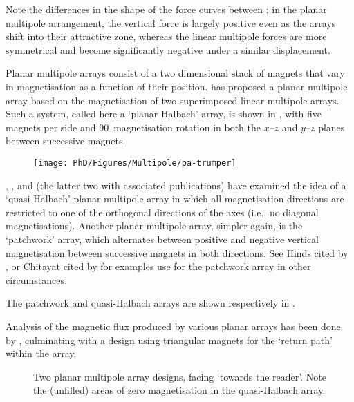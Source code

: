 \documentclass[11pt,a4paper]{memoir}
\begin{document}
Note the differences in the shape of the force curves between ; in the planar multipole arrangement, the vertical force is largely positive even as the arrays shift into their attractive zone, whereas the linear multipole forces are more symmetrical and become significantly negative under a similar displacement.

Planar multipole arrays consist of a two dimensional stack of magnets that vary in magnetisation as a function of their position.
\textcite[Appendix~A]{kim1997-thesis} has proposed a planar multipole array based on the magnetisation of two superimposed linear multipole arrays.
Such a system, called here a `planar Halbach' array, is shown in , with five magnets per side and 90\textdegree\ magnetisation rotation in both the $x$--$z$ and $y$--$z$ planes between successive magnets.

\begin{figure}
\centering
\texttt{[image: PhD/Figures/Multipole/pa-trumper]}
\end{figure}


\textcite{moser2002-maglev}, \textcite{rovers2009-ietm}, and \textcite{janssen2009-jsdd} (the latter two with associated publications) have examined the idea of a `quasi-Halbach' planar multipole array in which all magnetisation directions are restricted to one of the orthogonal directions of the axes (i.e., no diagonal magnetisations).
Another planar multipole array, simpler again, is the `patchwork' array, which alternates between positive and negative vertical magnetisation between successive magnets in both directions.
See Hinds cited by \textcite{kim1997-thesis}, or Chitayat cited by \textcite{cho2001} for examples use for the patchwork array in other circumstances.

The patchwork and quasi-Halbach arrays are shown respectively in .

Analysis of the magnetic flux produced by various planar arrays has been done by \textcite{cho2001}, culminating with a design using triangular magnets for the `return path' within the array.


\begin{figure}
\centering
{}\hfil
{}
\caption[Two planar multipole array designs.]{Two planar multipole array designs, facing `towards the reader'. Note the (unfilled) areas of zero magnetisation in the quasi-Halbach array.}
\end{figure}
\end{document}
